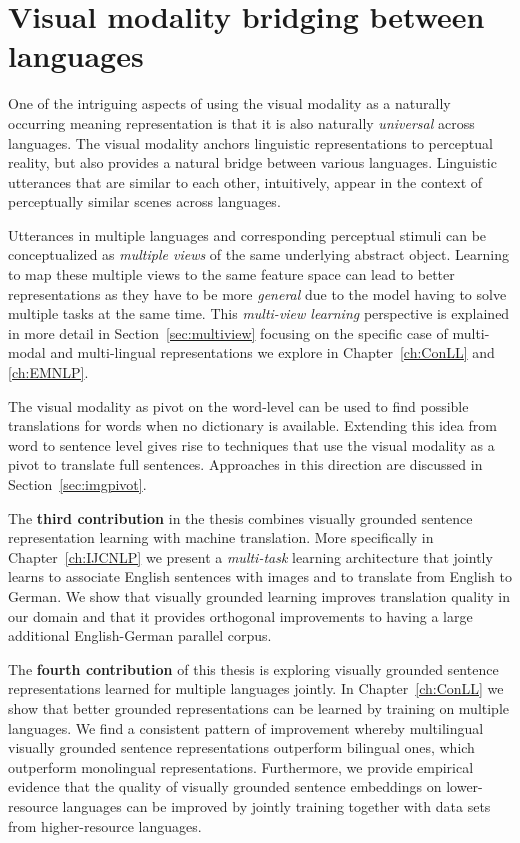 \section{Visual modality bridging between languages}

One of the intriguing aspects of using the visual modality as a naturally occurring
meaning representation is that it is also naturally \emph{universal} across languages.
The visual modality anchors linguistic representations to perceptual reality, but also
provides a natural bridge between various languages. Linguistic utterances that are similar
to each other, intuitively, appear in the context of perceptually similar scenes across languages.

Utterances in multiple languages and corresponding perceptual stimuli
can be conceptualized as \emph{multiple views} of the same underlying abstract object.
Learning to map these multiple views to the same feature space can lead to better representations as
they have to be more \emph{general} due to the model having to solve multiple tasks at the same time.
This \emph{multi-view learning} perspective is explained in more detail in Section~\ref{sec:multiview}
focusing on the specific case of multi-modal and multi-lingual representations we explore in
Chapter~\ref{ch:ConLL} and \ref{ch:EMNLP}.

The visual modality as pivot on the word-level can be used to find possible translations
for words when no dictionary is available. Extending this idea from word to sentence level gives rise to techniques that
use the visual modality as a pivot to translate full sentences. 
Approaches in this direction are discussed in Section~\ref{sec:imgpivot}.

The \textbf{third contribution} in the thesis combines visually grounded sentence representation learning
with machine translation. More specifically in Chapter~\ref{ch:IJCNLP} we present a \emph{multi-task}
learning architecture that jointly learns to associate English sentences with images and to translate from
English to German. We show that visually grounded learning improves translation quality in our domain and that
it provides orthogonal improvements to having a large additional English-German parallel corpus.

The \textbf{fourth contribution} of this thesis is exploring visually grounded 
sentence representations learned for multiple languages jointly.  
In Chapter~\ref{ch:ConLL} we show that better grounded
representations can be learned by training on multiple languages. We find a consistent pattern
of improvement whereby multilingual visually grounded sentence representations 
outperform bilingual ones, which outperform monolingual representations. 
Furthermore, we provide empirical evidence that the quality of
visually grounded sentence embeddings on lower-resource languages can be improved by jointly training
together with data sets from higher-resource languages.

